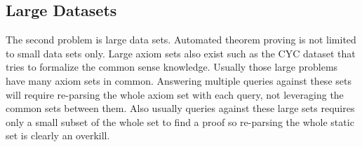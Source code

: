 \subsection{Large Datasets}
The second problem is large data sets. Automated theorem proving is not limited to small data sets only. Large axiom sets also exist such as the CYC dataset that tries to formalize the common sense knowledge. Usually those large problems have many axiom sets in common. Answering multiple queries against these sets will require re-parsing the whole axiom set with each query, not leveraging the common sets between them. Also usually queries against these large sets requires only a small subset of the whole set to find a proof so re-parsing the whole static set is clearly an overkill.
